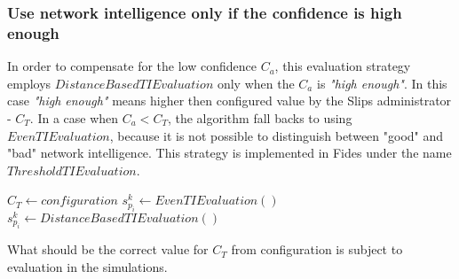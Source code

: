 \subsubsection{Use network intelligence only if the confidence is high enough}
In order to compensate for the low confidence $C_a$, this evaluation strategy employs $DistanceBasedTIEvaluation$ only when the $C_a$ is \textit{"high enough"}. In this case \textit{"high enough"} means higher then configured value by the Slips administrator - $C_T$. In a case when  $C_a < C_T$, the algorithm fall backs to using $EvenTIEvaluation$, because it is not possible to distinguish between "good" and "bad" network intelligence. This strategy is implemented in Fides under the name $ThresholdTIEvaluation$.
\begin{algorithm}
\caption{$ThresholdTIEvaluation$}\label{alg:threshold-ti-evaluation}
\begin{algorithmic}[1]
\State $C_T \gets configuration$ 
	\State $s^{k}_{p_i} \gets EvenTIEvaluation()$
\Else
    \State $s^{k}_{p_i} \gets DistanceBasedTIEvaluation()$
\EndIf
\end{algorithmic}
\end{algorithm}

What should be the correct value for $C_T$ from configuration is subject to evaluation in the simulations.


